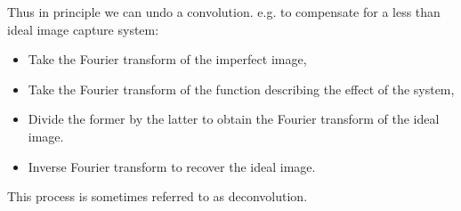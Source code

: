 Thus in principle we can undo a convolution. e.g. to compensate for a less than ideal image capture system:

\begin{itemize}
	\item Take the Fourier transform of the imperfect image,
	\item Take the Fourier transform of the function describing the effect of the system,
	\item Divide the former by the latter to obtain the Fourier transform of the ideal image.
	\item Inverse Fourier transform to recover the ideal image.
\end{itemize}
This process is sometimes referred to as deconvolution.


